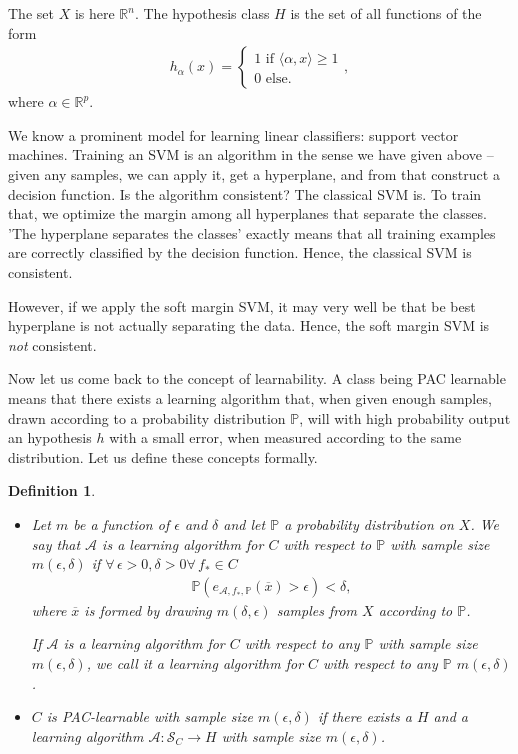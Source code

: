 \documentclass{article}
\newcommand{\calA}{\mathcal{A}}
\newcommand{\sprod}[1]{\langle #1 \rangle}
\newcommand{\calS}{\mathcal{S}}
\newcommand{\R}{\mathbb{R}}
\newtheorem{defi}{Definition}
\begin{document}
    The set $X$ is here $\R^n$. The hypothesis class $H$ is the set of all functions of the form
    \begin{align*}
        h_{\alpha}(x) = \begin{cases}
            1 \text{ if } \sprod{\alpha,x} \geq 1  \\
            0 \text{ else}.
        \end{cases},
    \end{align*}
    where $\alpha\in \R^p$.

    We know a prominent model for learning linear classifiers: support vector machines. Training an SVM is an algorithm in the sense we have given above -- given any samples, we can apply it, get a hyperplane, and from that construct a decision function. Is the algorithm consistent? The classical SVM is. To train that, we optimize the margin among all hyperplanes that separate the classes. 'The hyperplane separates the classes' exactly means that all training examples are correctly classified by the decision function. Hence, the classical SVM is consistent.

    However, if we apply the soft margin SVM, it may very well be that be best hyperplane is not actually separating the data. Hence, the soft margin SVM is \emph{not} consistent.

   

    



Now let us come back to the concept of learnability. A class being PAC learnable means that there exists a learning algorithm that, when given enough samples, drawn according to a probability distribution $\mathbb{P}$, will with high probability output an hypothesis $h$ with a small error, when measured according to the same distribution. Let us define these concepts formally.
\begin{defi}
    \begin{itemize}
        \item Let $m$ be a function of $\epsilon$ and $\delta$ and let $\mathbb{P}$ a probability distribution on $X$. We say that $\calA$ is a \emph{learning algorithm for $C$ with respect to $\mathbb{P}$ with sample size $m(\epsilon,\delta)$} if  $\forall \, \epsilon>0 , \delta>0 \forall \, f_* \in C$
        \begin{align*}
          \mathbb{P}( e_{\calA,f_*,\mathbb{P}}(\overline{x}) >\epsilon)<\delta,
        \end{align*}
        where $\overline{x}$ is formed by drawing $m(\delta,\epsilon)$ samples from $X$ according to $\mathbb{P}$. 

        If $\calA$ is a learning algorithm for $C$ with respect to any $\mathbb{P}$ with sample size $m(\epsilon,\delta)$, we call it a \emph{learning algorithm for $C$ with respect to any $\mathbb{P}$ $m(\epsilon,\delta)$.}
        \item $C$ is \emph{PAC-learnable} with sample size $m(\epsilon,\delta)$ if there exists a $H$ and a learning algorithm $\calA : \calS_C\to H$ with sample size $m(\epsilon,\delta)$. 
    \end{itemize}
\end{defi}
\end{document}
